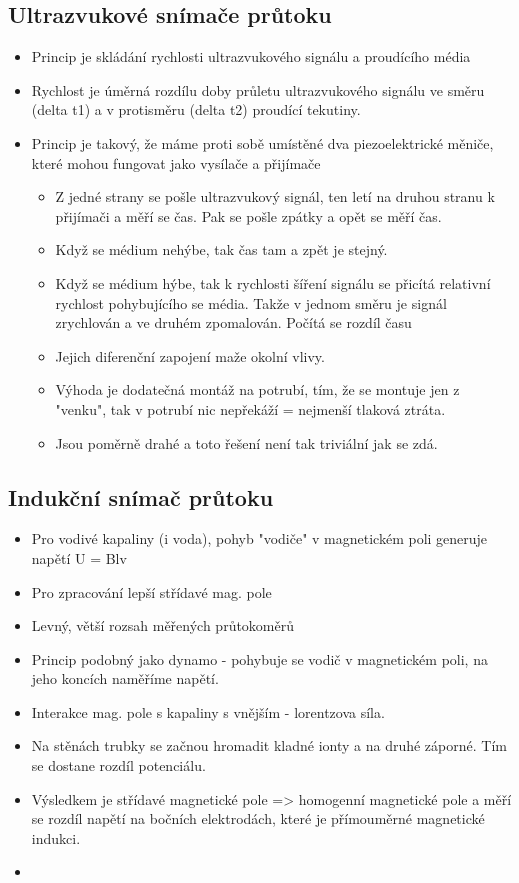 \subsection*{Ultrazvukové snímače průtoku}
\begin{itemize}
    \item Princip je skládání rychlosti ultrazvukového signálu a proudícího média
    \item Rychlost je úměrná rozdílu doby průletu ultrazvukového signálu ve směru (delta t1) a v protisměru (delta t2) proudící tekutiny.
    \item Princip je takový, že máme proti sobě umístěné dva piezoelektrické měniče, které mohou fungovat jako vysílače a přijímače \begin{itemize}
        \item Z jedné strany se pošle ultrazvukový signál, ten letí na druhou stranu k přijímači a měří se čas. Pak se pošle zpátky a opět se měří čas.
        \item Když se médium nehýbe, tak čas tam a zpět je stejný.
        \item Když se médium hýbe, tak k rychlosti šíření signálu se přicítá relativní rychlost pohybujícího se média. Takže v jednom směru je signál zrychlován a ve druhém zpomalován. Počítá se rozdíl času
        \item Jejich diferenční zapojení maže okolní vlivy.
        \item Výhoda je dodatečná montáž na potrubí, tím, že se montuje jen z "venku", tak v potrubí nic nepřekáží = nejmenší tlaková ztráta.
        \item Jsou poměrně drahé a toto řešení není tak triviální jak se zdá.
    \end{itemize} 
\end{itemize}

\subsection*{Indukční snímač průtoku}
\begin{itemize}
    \item Pro vodivé kapaliny (i voda), pohyb "vodiče" v magnetickém poli generuje napětí U = Blv
    \item Pro zpracování lepší střídavé mag. pole
    \item Levný, větší rozsah měřených průtokoměrů
    \item Princip podobný jako dynamo - pohybuje se vodič v magnetickém poli, na jeho koncích naměříme napětí.
    \item Interakce mag. pole s kapaliny s vnějším - lorentzova síla.
    \item Na stěnách trubky se začnou hromadit kladné ionty a na druhé záporné. Tím se dostane rozdíl potenciálu.
    \item Výsledkem je střídavé magnetické pole => homogenní magnetické pole a měří se rozdíl napětí na bočních elektrodách, které je přímouměrné magnetické indukci.
    \item 
\end{itemize}

